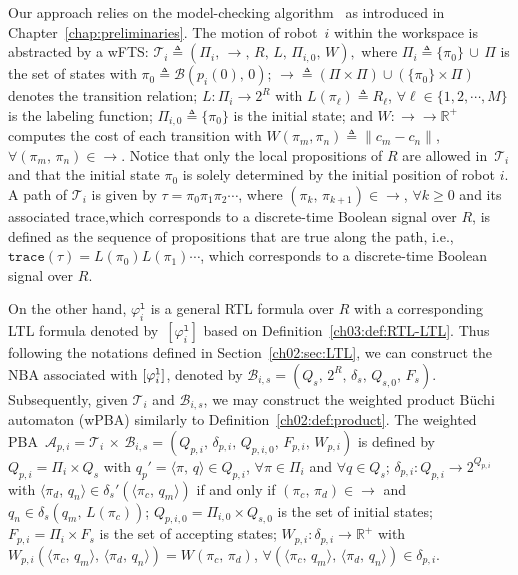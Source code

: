 Our approach relies on the model-checking algorithm~\cite{baier2008principles} as introduced in Chapter~\ref{chap:preliminaries}.
The motion of robot~$i$ within the workspace is abstracted by a wFTS:
$
\mathcal{T}_i \triangleq (\Pi_i,\, \longrightarrow, \, R,\, L,\, \Pi_{i,0},\,W),
$
where $\Pi_i\triangleq \{\pi_{0}\}\,\cup\,\Pi$ is the set of states with $\pi_{0} \triangleq \mathcal{B}(p_i(0),\,0)$;
$\longrightarrow \triangleq (\Pi\times \Pi)\cup (\{\pi_{0}\}\times \Pi)$ denotes the transition relation;
$L:\Pi_i\rightarrow 2^R$ with $L(\pi_{\ell}) \triangleq R_{\ell}$, $\forall \ell\in \{1,2,\cdots,M\}$ is the labeling function;
$\Pi_{i,0} \triangleq \{\pi_0\}$ is the initial state;
and $W: \longrightarrow \to \mathbb{R}^+$ computes the cost of each transition with $W(\pi_{m}, \pi_{n})\triangleq\|c_{m}-c_{n}\|$, $\forall (\pi_{m},\, \pi_{n})\in \longrightarrow$.
Notice that only the local propositions of $R$ are allowed in~$\mathcal{T}_i$ and that the initial state $\pi_0$ is solely determined by the initial position of robot $i$. A path of $\mathcal{T}_i$ is given by $\tau=\pi_0\pi_1\pi_2\cdots$, where $(\pi_k,\,\pi_{k+1})\in \longrightarrow$, $\forall k\geq 0$ and its associated trace,which corresponds to a discrete-time Boolean signal over $R$, is defined as the sequence of propositions that are true along the path, i.e., $\texttt{trace}(\tau)=L(\pi_0)L(\pi_1)\cdots$, which corresponds to a discrete-time Boolean signal over $R$.

On the other hand,  $\varphi_{i}^\texttt{l}$ is a general RTL formula over $R$ with a corresponding LTL formula denoted by~$[\varphi_{i}^\texttt{l}]$ based on Definition~\ref{ch03:def:RTL-LTL}.
Thus following the notations defined in Section~\ref{ch02:sec:LTL}, we can construct the NBA associated with $[\varphi_i^{\textup{\texttt{l}}}]$, denoted by $\mathcal{B}_{i,s}=(Q_s, \,2^{R},\, \delta_s,\, Q_{s,0},\, F_s)$.
Subsequently, given $\mathcal{T}_i$ and $\mathcal{B}_{i,s}$, we may construct the weighted product B\"uchi automaton (wPBA) similarly to Definition~\ref{ch02:def:product}.
The weighted PBA~${\mathcal{A}}_{p,i}=\mathcal{T}_i \, {\times}\, \mathcal{B}_{i,s} =(Q_{p,i},\, \delta_{p,i}, \, Q_{p,i,0},\, F_{p,i},\, W_{p,i})$ is defined by
$Q_{p,i}=\Pi_i \times Q_s$ with $q_p'= \langle \pi,\, q \rangle \in Q_{p,i} $,  $\forall \pi\in \Pi_i$ and $\forall q \in Q_s$;
$\delta_{p,i}: Q_{p,i} \rightarrow 2^{Q_{p,i}}$ with $\langle \pi_d,\, q_n \rangle\in \delta_s'(\langle \pi_c,\, q_m \rangle)$ if and only if $(\pi_c,\,\pi_d)\in \longrightarrow$ and $q_n\in \delta_s(q_m,\, L(\pi_c))$;
$Q_{p,i,0}= \Pi_{i,0}\times Q_{s,0}$ is  the set of initial states;
$F_{p,i}=\Pi_i \times F_s$ is  the  set of  accepting states;
$W_{p,i}:\delta_{p,i}\rightarrow \mathbb{R}^+$ with $W_{p,i}(\langle \pi_{c},\,q_m\rangle, \, \langle \pi_{d},\,q_n\rangle)=W(\pi_c, \,  \pi_d)$, $\forall (\langle \pi_{c},\,q_m\rangle, \, \langle \pi_{d},\,q_n\rangle)\in \delta_{p,i}$.


